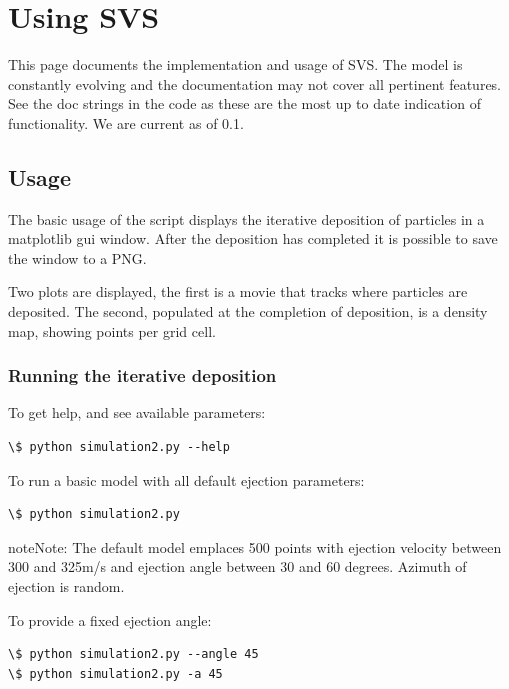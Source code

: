 \documentclass[letterpaper,10pt,english]{sphinxmanual}
\begin{document}
\chapter{Using SVS}
\label{Using:using-svs}\label{Using:using}\label{Using::doc}
This page documents the implementation and usage of SVS.  The model is constantly evolving and the documentation may not cover all pertinent features.  See the doc strings in the code as these are the most up to date indication of functionality.  We are current as of 0.1.


\section{Usage}
\label{Using:usage}
The basic usage of the script displays the iterative deposition of particles in a matplotlib gui window.  After the deposition has completed it is possible to save the window to a PNG.

Two plots are displayed, the first is a movie that tracks where particles are deposited.  The second, populated at the completion of deposition, is a density map, showing points per grid cell.


\subsection{Running the iterative deposition}
\label{Using:running-the-iterative-deposition}
To get help, and see available parameters:

\begin{Verbatim}[commandchars=\\\{\}]
\$ python simulation2.py --help
\end{Verbatim}

To run a basic model with all default ejection parameters:

\begin{Verbatim}[commandchars=\\\{\}]
\$ python simulation2.py
\end{Verbatim}

\begin{notice}{note}{Note:}
The default model emplaces 500 points with ejection velocity between 300 and 325m/s and ejection angle between 30 and 60 degrees.  Azimuth of ejection is random.
\end{notice}

To provide a fixed ejection angle:

\begin{Verbatim}[commandchars=\\\{\}]
\$ python simulation2.py --angle 45
\$ python simulation2.py -a 45
\end{Verbatim}
\end{document}
